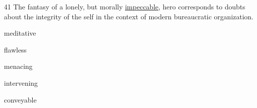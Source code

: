 \begin{question}{41}
The fantasy of a lonely, but morally \uline{impeccable}, hero corresponds to doubts about the integrity of the self in the context of modern bureaucratic organization.
\begin{choices}
  \item meditative
  \item flawless
  \item menacing
  \item intervening
  \item conveyable
\end{choices}
\end{question}
